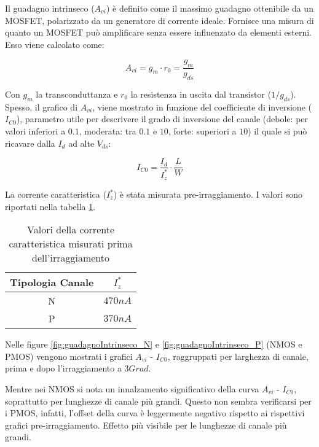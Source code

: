 Il guadagno intrinseco ($A_{vi}$) è definito come il massimo guadagno ottenibile da un MOSFET, polarizzato da un generatore di corrente ideale. Fornisce una misura di quanto un MOSFET può amplificare senza essere influenzato da elementi esterni. Esso viene calcolato come:

$$A_{vi} = g_{m} \cdot r_0 = \frac{g_{m}}{g_{ds}} $$

Con $g_m$ la transconduttanza e $r_0$ la resistenza in uscita dal transistor (${1}/{g_{ds}}$). Spesso, il grafico di $A_{vi}$, viene mostrato in funzione del coefficiente di inversione ($I_{C0}$), parametro utile per descrivere il grado di inversione del canale (debole: per valori inferiori a $0.1$, moderata: tra $0.1$ e $10$, forte: superiori a $10$) il quale si può ricavare dalla $I_d$ ad alte $V_{ds}$:

$$I_{C0} = \frac{I_{d}}{I_{z}^{*}} \cdot \frac{L}{W}$$

La corrente caratteristica ($I_{z}^{*}$) è stata misurata pre-irraggiamento. I valori sono riportati nella tabella \ref{tab:corrente_caratteristica}.

\begin{table}[ht]
    \centering
    \begin{tabular}{c c}
        \toprule
        Tipologia Canale & $I_{z}^{*}$ \\
        \midrule
        N                & $470nA$     \\
        P                & $370nA$     \\
        \bottomrule
    \end{tabular}
    \caption{Valori della corrente caratteristica misurati prima dell'irraggiamento}
    \label{tab:corrente_caratteristica}
\end{table}


Nelle figure \ref{fig:guadagnoIntrinseco_N} e \ref{fig:guadagnoIntrinseco_P} (NMOS e PMOS) vengono mostrati i grafici $A_{vi}$ - $I_{C0}$, raggruppati per larghezza di canale, prima e dopo l'irraggiamento a $3Grad$.

Mentre nei NMOS si nota un innalzamento significativo della curva $A_{vi}$ - $I_{C0}$, soprattutto per lunghezze di canale più grandi. Questo non sembra verificarsi per i PMOS, infatti, l'offset della curva è leggermente negativo rispetto ai rispettivi grafici pre-irraggiamento. Effetto più visibile per le lunghezze di canale più grandi.


